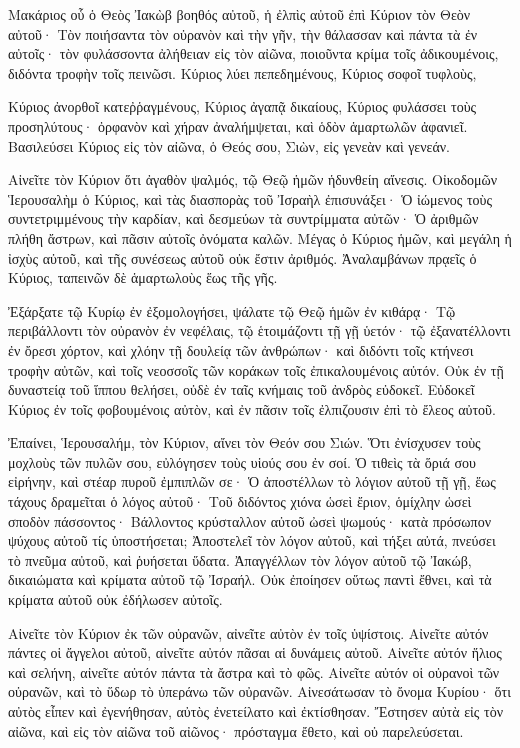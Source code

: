 \begin{spacing}{1.1}
\begin{multicols}{2}
Μακάριος οὗ ὁ Θεὸς Ἰακὼβ βοηθός αὐτοῦ, ἡ ἐλπὶς αὐτοῦ ἐπὶ Κύριον τὸν Θεὸν αὐτοῦ·
Τὸν ποιήσαντα τὸν οὐρανὸν καὶ τὴν γῆν, τὴν θάλασσαν καὶ πάντα τὰ ἐν αὐτοῖς· τὸν φυλάσσοντα ἀλήθειαν εἰς τὸν αἰῶνα,
ποιοῦντα κρίμα τοῖς ἀδικουμένοις, διδόντα τροφὴν τοῖς πεινῶσι. Κύριος λύει πεπεδημένους,
Κύριος σοφοῖ τυφλοὺς,

Κύριος ἀνορθοῖ κατεῤῥαγμένους, Κύριος ἀγαπᾷ δικαίους,
Κύριος φυλάσσει τοὺς προσηλύτους· ὀρφανὸν καὶ χήραν ἀναλήμψεται, καὶ ὁδὸν ἁμαρτωλῶν ἀφανιεῖ.
Βασιλεύσει Κύριος εἰς τὸν αἰῶνα, ὁ Θεός σου, Σιὼν, εἰς γενεὰν καὶ γενεάν.

Αἰνεῖτε τὸν Κύριον ὅτι ἀγαθὸν ψαλμός, τῷ Θεῷ ἡμῶν ἡδυνθείη αἴνεσις.
Οἰκοδομῶν Ἱερουσαλὴμ ὁ Κύριος, καὶ τὰς διασπορὰς τοῦ Ἰσραὴλ ἐπισυνάξει·
Ὁ ἰώμενος τοὺς συντετριμμένους τὴν καρδίαν, καὶ δεσμεύων τὰ συντρίμματα αὐτῶν·
Ὁ ἀριθμῶν πλήθη ἄστρων, καὶ πᾶσιν αὐτοῖς ὀνόματα καλῶν.
Μέγας ὁ Κύριος ἡμῶν, καὶ μεγάλη ἡ ἰσχὺς αὐτοῦ, καὶ τῆς συνέσεως αὐτοῦ οὐκ ἔστιν ἀριθμός.
Ἀναλαμβάνων πρᾳεῖς ὁ Κύριος, ταπεινῶν δὲ ἁμαρτωλοὺς ἕως τῆς γῆς.

Ἐξάρξατε τῷ Κυρίῳ ἐν ἐξομολογήσει, ψάλατε τῷ Θεῷ ἡμῶν ἐν κιθάρᾳ·
Τῷ περιβάλλοντι τὸν οὐρανὸν ἐν νεφέλαις, τῷ ἑτοιμάζοντι τῇ γῇ ὑετόν· τῷ ἐξανατέλλοντι ἐν ὄρεσι χόρτον, καὶ χλόην τῇ δουλείᾳ τῶν ἀνθρώπων·
καὶ διδόντι τοῖς κτήνεσι τροφὴν αὐτῶν, καὶ τοῖς νεοσσοῖς τῶν κοράκων τοῖς ἐπικαλουμένοις αὐτόν.
Οὐκ ἐν τῇ δυναστείᾳ τοῦ ἵππου θελήσει, οὐδὲ ἐν ταῖς κνήμαις τοῦ ἀνδρὸς εὐδοκεῖ.
Εὐδοκεῖ Κύριος ἐν τοῖς φοβουμένοις αὐτὸν, καὶ ἐν πᾶσιν τοῖς ἐλπιζουσιν ἐπὶ τὸ ἔλεος αὐτοῦ.

Ἐπαίνει, Ἱερουσαλήμ, τὸν Κύριον, αἴνει τὸν Θεόν σου Σιών.
Ὅτι ἐνίσχυσεν τοὺς μοχλοὺς τῶν πυλῶν σου, εὐλόγησεν τοὺς υἱούς σου ἐν σοί.
Ὁ τιθεὶς τὰ ὅριά σου εἰρήνην, καὶ στέαρ πυροῦ ἐμπιπλῶν σε·
Ὁ ἀποστέλλων τὸ λόγιον αὐτοῦ τῇ γῇ, ἕως τάχους δραμεῖται ὁ λόγος αὐτοῦ·
Τοῦ διδόντος χιόνα ὡσεὶ ἔριον, ὁμίχλην ὡσεὶ σποδὸν πάσσοντος·
Βάλλοντος κρύσταλλον αὐτοῦ ὠσεὶ ψωμούς· κατὰ πρόσωπον ψύχους αὐτοῦ τίς ὑποστήσεται;
Ἀποστελεῖ τὸν λόγον αὐτοῦ, καὶ τήξει αὐτά, πνεύσει τὸ πνεῦμα αὐτοῦ, καὶ ῥυήσεται ὕδατα.
Ἀπαγγέλλων τὸν λόγον αὐτοῦ τῷ Ἰακώβ, δικαιώματα καὶ κρίματα αὐτοῦ τῷ Ἰσραήλ.
Οὐκ ἐποίησεν οὕτως παντὶ ἔθνει, καὶ τὰ κρίματα αὐτοῦ οὐκ ἐδήλωσεν αὐτοῖς.

Αἰνεῖτε τὸν Κύριον ἐκ τῶν οὐρανῶν, αἰνεῖτε αὐτὸν ἐν τοῖς ὑψίστοις.
Αἰνεῖτε αὐτόν πάντες οἱ ἄγγελοι αὐτοῦ, αἰνεῖτε αὐτόν πᾶσαι αἱ δυνάμεις αὐτοῦ.
Αἰνεῖτε αὐτόν ἥλιος καὶ σελήνη, αἰνεῖτε αὐτόν πάντα τὰ ἄστρα καὶ τὸ φῶς.
Αἰνεῖτε αὐτόν οἱ οὐρανοὶ τῶν οὐρανῶν, καὶ τὸ ὕδωρ τὸ ὑπεράνω τῶν οὐρανῶν.
Αἰνεσάτωσαν τὸ ὄνομα Κυρίου· ὅτι αὐτὸς εἶπεν καὶ ἐγενήθησαν, αὐτὸς ἐνετείλατο καὶ ἐκτίσθησαν.
Ἔστησεν αὐτὰ εἰς τὸν αἰῶνα, καὶ εἰς τὸν αἰῶνα τοῦ αἰῶνος· πρόσταγμα ἔθετο, καὶ οὐ παρελεύσεται.


\end{multicols}
\end{spacing}
